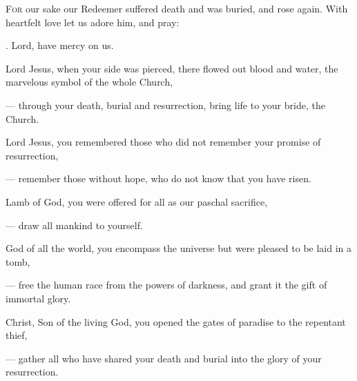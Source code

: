 \lettrine[loversize=0.15,lines=2]{F}{or} our sake our Redeemer suffered death and was buried, and rose again. With heartfelt love let us adore him, and pray: 

\Rbar. Lord, have mercy on us.

\vspace{5pt}

\begin{hangparas}{15pt}{1}

Lord Jesus, when your side was pierced, there flowed out blood and water, the marvelous symbol of the whole Church,\par
— through your death, burial and resurrection, bring life to your bride, the Church.

\vspace{5pt}

Lord Jesus, you remembered those who did not remember your promise of resurrection,\par
— remember those without hope, who do not know that you have risen.

\vspace{5pt}

Lamb of God, you were offered for all as our paschal sacrifice,\par
— draw all mankind to yourself.

\vspace{5pt}


God of all the world, you encompass the universe but were pleased to be laid in a tomb,\par
— free the human race from the powers of darkness, and grant it the gift of immortal glory.

\vspace{5pt}

Christ, Son of the living God, you opened the gates of paradise to the repentant thief,\par
— gather all who have shared your death and burial into the glory of your resurrection.

\end{hangparas}